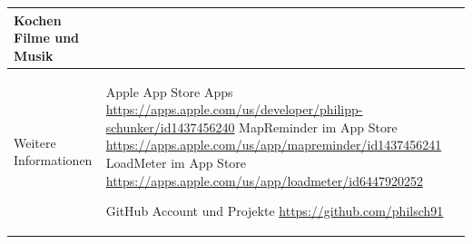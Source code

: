 \begin{longtable}{p{}|p{}}
	\tabitem Kochen \newline
	\tabitem Filme und Musik \\ \bottomrule
	Weitere Informationen &
	Apple App Store Apps \newline
	\small{\url{https://apps.apple.com/us/developer/philipp-schunker/id1437456240}} \newline
	MapReminder im App Store \newline
	\small{\url{https://apps.apple.com/us/app/mapreminder/id1437456241}} \newline
	LoadMeter im App Store \newline
	\small{\url{https://apps.apple.com/us/app/loadmeter/id6447920252}} \newline

	GitHub Account und Projekte \newline
	\small{\url{https://github.com/philsch91}} \newline
\end{longtable}

